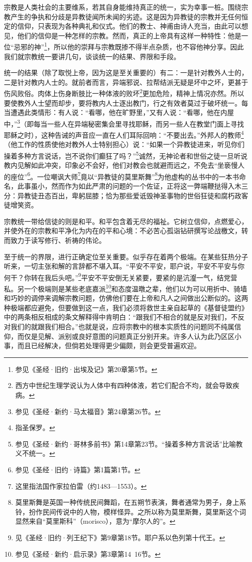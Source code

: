 \par 宗教是人类社会的主要维系，若其自身能维持真正的统一，实为幸事一桩。围绕宗教产生的争执和分歧是异教徒闻所未闻的劣迹。这是因为异教徒的宗教并无任何恒定的信仰，只表现为各种典礼和仪式。他们的教士、神甫由诗人充当，由此可以想见，他们的信仰是一种怎样的宗教。然而，真正的上帝具有这样一种特性：他是一位“忌邪的神”\footnote{参见《圣经·旧约·出埃及记》第20章第5节。}，所以他的崇拜与宗教既掺不得半点杂质，也不容他神分享。因此我们就宗教统一要讲几句，谈谈统一的结果、界限和手段。
\par 统一的结果（除了取悦上帝，因为这是至关重要的）有二：一是针对教外人士的，二是针对教内人士的。就前者而言，异端邪说、拉帮结派无疑是坏中之坏，更甚于伤风败俗。肉体上伤身断肢比一种体液的败坏\footnote{西方中世纪生理学说认为人体中有四种体液，若它们配合不均，就会导致疾病。}更加危险，精神上情况亦然。所以要使教外人士望而却步，要将教内人士逐出教门，行之有效者莫过于破坏统一。每当遭遇此类情形：有人说：“看哪，他在旷野里，”又有人说：“看哪，他在内屋中，”\footnote{参见《圣经·新约·马太福音》第24章第26节。}（即每当一些人在异端秘密集会里寻找耶稣，而另一些人在教堂门面上寻找耶稣之时），这种告诫的声音应一直在人们耳际回响：“不要出去。”外邦人的教师\footnote{指圣保罗。}（他工作的性质使他对教外人士特别担心）说：“如果一个异教徒进来，听见你们操着多种方言说话，岂不说你们癫狂了吗？”\footnote{参见《圣经·新约·哥林多前书》第14章第23节。“操着多种方言说话”比喻教义不统一。}诚然，无神论者和世俗之徒一旦听说教内见解如此冲突，印象必不会好，他们对教会也就避而远之，不免去“坐亵慢人的座位”\footnote{参见《圣经·旧约·诗篇》第1篇第1节。}。一位嘲讽大师\footnote{这里指法国作家拉伯雷（约1483—1553）。}竟以“异教徒的莫里斯舞”\footnote{莫里斯舞是英国一种传统民间舞蹈，在五朔节表演，舞者通常为男子，身上系铃，扮作民间传说中的人物，模样怪异。之所以称为莫里斯舞，莫里斯这个词显然来自“莫里斯科”（morisco），意为“摩尔人的”。}为他虚构的丛书中的一本书命名，此事虽小，然而作为如此严肃的问题的一个佐证，正将这一弊端鞭挞得入木三分：异教徒丑态百出，卑躬屈膝；恰为那些爱诋毁神圣事物的世俗狂徒和腐朽政客徒增笑资。
\par 宗教统一带给信徒的则是和平。和平包含着无尽的福祉。它树立信仰，点燃爱心，并使外在的宗教和平净化为内在的平和心境：不必苦心孤诣钻研撰写论战檄文，转而致力于读写修行、祈祷的伟论。
\par 至于统一的界限，进行正确定位至关重要。似乎存在着两个极端。在某些狂热分子听来，一切主张和解的言辞都不堪入耳。“平安不平安，耶户说，平安不平安与你何干？你转在我后头吧。”\footnote{见《圣经·旧约·列王纪下》第9章第18节。耶户系以色列第十代王。}平安不平安倒无关紧要，要紧的是沆瀣一气，结党营私。另一个极端则是某些老底嘉派\footnote{参见《圣经·新约·启示录》第3章第14~16节。}和态度温暾之辈，他们以为可以用折中、骑墙和巧妙的调停来调解宗教问题，仿佛他们要在上帝和凡人之间做出公断似的。这两种极端都应避免，但要做到这一点，我们必须将救世主亲自起草的《基督徒盟约》中的两条相反相成的条文解释得中肯明白：“跟我们不相合的就是反对我们，不反对我们的就跟我们相合。”也就是说，应将宗教中的根本实质性的问题同不纯属信仰，而仅是见解、派别或良好意图的问题真正分别开来。许多人认为此乃区区小事，而且已经解决，但倘若处理得更少偏颇，则会更受普遍欢迎。

